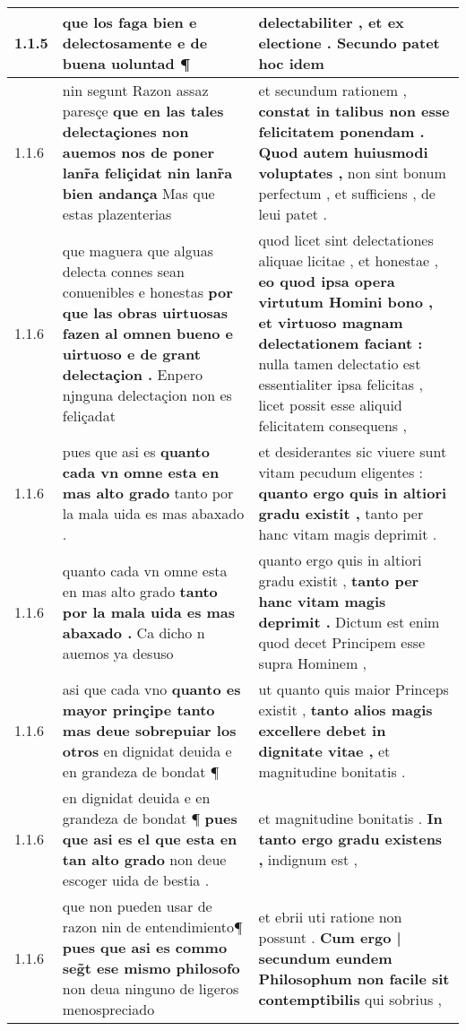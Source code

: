 \begin{tabular}{|p{1cm}|p{6.5cm}|p{6.5cm}|}
1.1.5 & que los faga bien e delectosamente \textbf{ e de buena uoluntad } ¶ & delectabiliter , \textbf{ et ex electione . } Secundo patet hoc idem \\\hline
1.1.6 & nin segunt Razon assaz paresçe \textbf{ que en las tales delectaçiones non auemos nos de poner lanr̃a feliçidat nin lanr̃a bien andança } Mas que estas plazenterias & et secundum rationem , \textbf{ constat in talibus non esse felicitatem ponendam . Quod autem huiusmodi voluptates , } non sint bonum perfectum , et sufficiens , de leui patet . \\\hline
1.1.6 & que maguera que alguas delecta connes sean conuenibles e honestas \textbf{ por que las obras uirtuosas fazen al omnen bueno e uirtuoso e de grant delectaçion . } Enpero njnguna delectaçion non es feliçadat & quod licet sint delectationes aliquae licitae , et honestae , \textbf{ eo quod ipsa opera virtutum Homini bono , et virtuoso magnam delectationem faciant : } nulla tamen delectatio est essentialiter ipsa felicitas , licet possit esse aliquid felicitatem consequens , \\\hline
1.1.6 & pues que asi es \textbf{ quanto cada vn omne esta en mas alto grado } tanto por la mala uida es mas abaxado . & et desiderantes sic viuere sunt vitam pecudum eligentes : \textbf{ quanto ergo quis in altiori gradu existit , } tanto per hanc vitam magis deprimit . \\\hline
1.1.6 & quanto cada vn omne esta en mas alto grado \textbf{ tanto por la mala uida es mas abaxado . } Ca dicho n auemos ya desuso & quanto ergo quis in altiori gradu existit , \textbf{ tanto per hanc vitam magis deprimit . } Dictum est enim quod decet Principem esse supra Hominem , \\\hline
1.1.6 & asi que cada vno \textbf{ quanto es mayor prinçipe tanto mas deue sobrepuiar los otros } en dignidat deuida e en grandeza de bondat ¶ & ut quanto quis maior Princeps existit , \textbf{ tanto alios magis excellere debet in dignitate vitae , } et magnitudine bonitatis . \\\hline
1.1.6 & en dignidat deuida e en grandeza de bondat ¶ \textbf{ pues que asi es el que esta en tan alto grado } non deue escoger uida de bestia . & et magnitudine bonitatis . \textbf{ In tanto ergo gradu existens , } indignum est , \\\hline
1.1.6 & que non pueden usar de razon nin de entendimiento¶ \textbf{ pues que asi es commo seg̃t ese mismo philosofo } non deua ninguno de ligeros menospreciado & et ebrii uti ratione non possunt . \textbf{ Cum ergo | secundum eundem Philosophum non facile sit contemptibilis } qui sobrius , \\\hline

\end{tabular}
